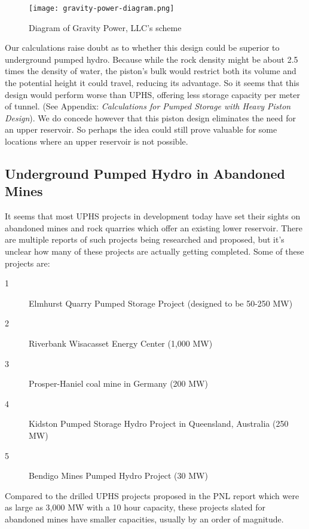 \documentclass[hidelinks,12pt,a4paper]{article}
\begin{document}
\begin{figure}[ht!]
    \centering
    \texttt{[image: gravity-power-diagram.png]}
    \caption{Diagram of Gravity Power, LLC's scheme \cite{GravityPowerTechnologyPage}}
\end{figure}
\FloatBarrier

Our calculations raise doubt as to whether this design could be superior to underground pumped hydro. Because while the rock density might be about 2.5 times the density of water, the piston's bulk would restrict both its volume and the potential height it could travel, reducing its advantage. So it seems that this design would perform worse than UPHS, offering less storage capacity per meter of tunnel. (See Appendix: \textit{Calculations for Pumped Storage with Heavy Piston Design}). We do concede however that this piston design eliminates the need for an upper reservoir. So perhaps the idea could still prove valuable for some locations where an upper reservoir is not possible.


\subsection{Underground Pumped Hydro in Abandoned Mines}
It seems that most UPHS projects in development today have set their sights on abandoned mines and rock quarries which offer an existing lower reservoir. There are multiple reports of such projects being researched and proposed, but it's unclear how many of these projects are actually getting completed. Some of these projects are:\cite{SubSurfacePumpedHydroelectricStorage, GermanCoalMineMayBePrimeForPumpedStorage, 250MWKidstonPumpedStorageHydroProject, BendigoMinesPumpedHydroProject}
{\footnotesize
\begin{description}
    \item[1] Elmhurst Quarry Pumped Storage Project (designed to be 50-250 MW)
    \item[2] Riverbank Wisacasset Energy Center (1,000 MW)
    \item[3] Prosper-Haniel coal mine in Germany (200 MW)
    \item[4] Kidston Pumped Storage Hydro Project in Queensland, Australia (250 MW)
    \item[5] Bendigo Mines Pumped Hydro Project (30 MW)
\end{description}
}

Compared to the drilled UPHS projects proposed in the PNL report which were as large as 3,000 MW with a 10 hour capacity,\cite{UndergroundPumpedHydroelectricStorage} these projects slated for abandoned mines have smaller capacities, usually by an order of magnitude.
\end{document}

